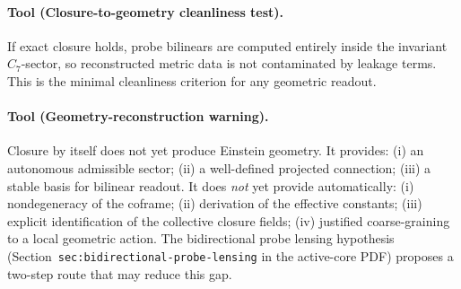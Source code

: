 \paragraph{Tool (Closure-to-geometry cleanliness test).}
If exact closure holds, probe bilinears are computed entirely inside
the invariant $C_7$-sector, so reconstructed metric data is not
contaminated by leakage terms. This is the minimal cleanliness
criterion for any geometric readout.

\paragraph{Tool (Geometry-reconstruction warning).}
Closure by itself does not yet produce Einstein geometry. It provides:
(i) an autonomous admissible sector; (ii) a well-defined projected
connection; (iii) a stable basis for bilinear readout. It does
\emph{not} yet provide automatically: (i) nondegeneracy of the
coframe; (ii) derivation of the effective constants; (iii) explicit
identification of the collective closure fields; (iv) justified
coarse-graining to a local geometric action. The bidirectional probe
lensing hypothesis (Section~\texttt{sec:bidirectional-probe-lensing} in the active-core PDF)
proposes a two-step route that may reduce this gap.


